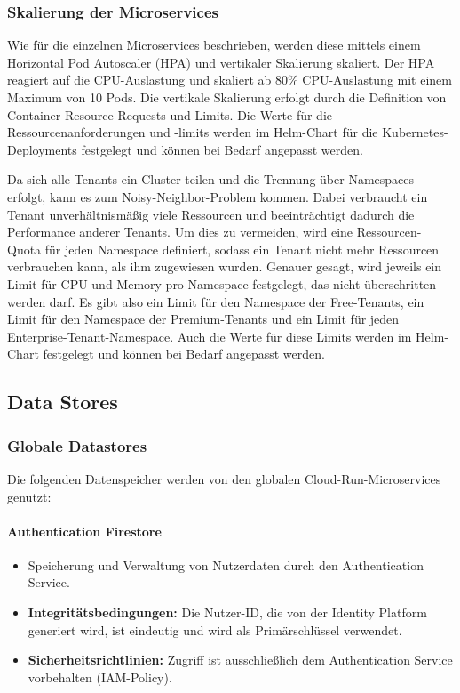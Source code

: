 \subsubsection{Skalierung der Microservices}

Wie für die einzelnen Microservices beschrieben, werden diese mittels einem Horizontal Pod Autoscaler (HPA) und vertikaler Skalierung skaliert. 
Der HPA reagiert auf die CPU-Auslastung und skaliert ab 80\% CPU-Auslastung mit einem Maximum von 10 Pods. 
Die vertikale Skalierung erfolgt durch die Definition von Container Resource Requests und Limits. 
Die Werte für die Ressourcenanforderungen und -limits werden im Helm-Chart für die Kubernetes-Deployments festgelegt und können bei Bedarf angepasst werden.

Da sich alle Tenants ein Cluster teilen und die Trennung über Namespaces erfolgt, kann es zum Noisy-Neighbor-Problem kommen.
Dabei verbraucht ein Tenant unverhältnismäßig viele Ressourcen und beeinträchtigt dadurch die Performance anderer Tenants.
Um dies zu vermeiden, wird eine Ressourcen-Quota für jeden Namespace definiert, sodass ein Tenant nicht mehr Ressourcen verbrauchen kann, als ihm zugewiesen wurden.
Genauer gesagt, wird jeweils ein Limit für CPU und Memory pro Namespace festgelegt, das nicht überschritten werden darf.
Es gibt also ein Limit für den Namespace der Free-Tenants, ein Limit für den Namespace der Premium-Tenants und ein Limit für 
jeden Enterprise-Tenant-Namespace. Auch die Werte für diese Limits werden im Helm-Chart festgelegt und können bei Bedarf angepasst werden.

\subsection{Data Stores}

\subsubsection{Globale Datastores}
Die folgenden Datenspeicher werden von den globalen Cloud-Run-Microservices genutzt:

\paragraph{Authentication Firestore}
\begin{itemize}
	\item Speicherung und Verwaltung von Nutzerdaten durch den Authentication Service.
	\item \textbf{Integritätsbedingungen:} Die Nutzer-ID, die von der Identity Platform generiert wird, ist eindeutig und wird als Primärschlüssel verwendet.
	\item \textbf{Sicherheitsrichtlinien:} Zugriff ist ausschließlich dem Authentication Service vorbehalten (IAM-Policy).
\end{itemize}

